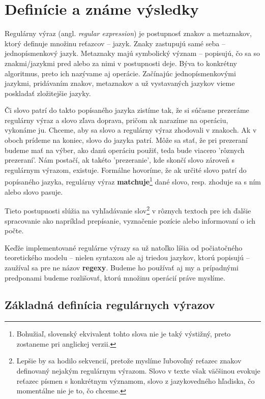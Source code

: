 \chapter{Definície a známe výsledky}
\label{chap:kapitola1}

Regulárny výraz (angl. \textit{regular expression}) je postupnosť znakov a metaznakov, ktorý definuje množinu reťazcov -- jazyk. Znaky zastupujú samé seba -- jednopísmenkový jazyk. Metaznaky majú symbolický význam -- popisujú, čo sa so znakmi/jazykmi pred alebo za nimi v postupnosti deje. Býva to konkrétny algoritmus, preto ich nazývame aj operácie. Začínajúc jednopísmenkovými jazykmi, pridávaním znakov, metaznakov a už vystavaných jazykov vieme poskladať zložitejšie jazyky.

Či slovo patrí do takto popísaného jazyka zistíme tak, že si súčasne prezeráme re\-gu\-lár\-ny výraz a slovo zľava doprava, pričom ak narazíme na operáciu, vykonáme ju. Chceme, aby sa slovo a regulárny výraz zhodovali v znakoch. Ak v oboch prídeme na koniec, slovo do jazyka patrí. Môže sa stať, že pri prezeraní budeme mať na výber, ako danú operáciu použiť, teda bude viacero 'rôznych prezeraní'. Nám postačí, ak takéto 'prezeranie', kde skončí slovo zároveň s regulárnym výrazom, existuje. Formálne ho\-vo\-rí\-me, že ak určité slovo patrí do popísaného jazyka, regulárny výraz \textbf{matchuje}\footnote{Bohužiaľ, slovenský ekvivalent tohto slova nie je taký výstižný, preto zostaneme pri anglickej verzii.} dané slovo, resp. zhoduje sa s ním alebo slovo pasuje.

Tieto postupnosti slúžia na vyhľadávanie slov\footnote{Lepšie by sa hodilo sekvencií, pretože myslíme ľubovoľný reťazec znakov definovaný nejakým regulárnym výrazom. Slovo v texte však väčšinou evokuje reťazec písmen s konkrétnym významom, slovo z jazykovedného hľadiska, čo momentálne nie je to, čo chceme.} v rôznych textoch pre ich ďalšie spracovanie ako napríklad prepísanie, vyznačenie pozície alebo informovaní o ich počte.

Keďže implementované regulárne výrazy sa už natoľko líšia od počiatočného teoretického modelu -- nielen syntaxou ale aj triedou jazykov, ktorú popisujú -- zaužíval sa pre ne názov \textbf{regexy}. Budeme ho používať aj my a prípadnými predponami budeme rozlišovať, ktorú množinu operácií práve myslíme.

\section{Základná definícia regulárnych výrazov}
\label{def}

